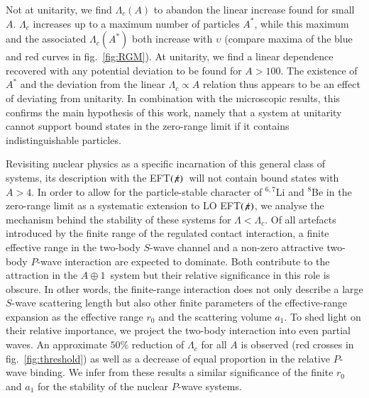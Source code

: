 \documentclass[preprint,12pt]{elsarticle}
\newcommand{\lc}{\ensuremath{\Lambda_c}}
\newcommand{\abb}{\mbox{\ensuremath{A\oplus 1}}}
\newcommand{\eftnopi}{\mbox{EFT$(\not \! \pi)$}}
\newcommand{\figref}[1]{fig.~\ref{#1}}
\begin{document}
Not at unitarity, we find $\lc(A)$ to abandon the linear increase found for small $A$.
$\lc$ increases up to a maximum number of particles $A^*$, while this maximum and the associated $\lc(A^*)$
both increase with $\upsilon$ (compare maxima of the blue and red curves in fig.~\ref{fig:RGM}). At unitarity,
we find a linear dependence recovered with any potential deviation to be found for $A>100$.
The existence of $A^*$ and the deviation from the linear $\Lambda_c\propto A$ relation thus appears to be an effect of deviating from unitarity.
In combination with the microscopic results, this confirms the main hypothesis of this work, namely that a system at unitarity cannot
support bound states in the zero-range limit if it contains indistinguishable particles.

Revisiting nuclear physics as a specific incarnation of this general class of systems,
its description with the \eftnopi~will not contain bound states with $A>4$.
In order to allow for the particle-stable character of $^{6,7}$Li and $^8$Be in the zero-range limit as a systematic
extension to LO \eftnopi, we analyse the mechanism behind the stability of these systems for $\Lambda<\lc$.
Of all artefacts introduced by the finite range of the regulated contact interaction,
a finite effective range in the two-body $S$-wave channel and a non-zero attractive two-body $P$-wave interaction are expected to dominate. 
Both contribute to the attraction in the \abb~system but their relative significance in this role is obscure.
In other words, the finite-range interaction does not only describe a large $S$-wave scattering length but
also other finite parameters of the effective-range expansion as the effective range $r_0$ and the scattering volume $a_1$.
To shed light on their relative importance, we project the two-body interaction into even partial waves.
An approximate $50\%$ reduction of $\lc$ for all $A$ is observed (red crosses in \figref{fig:threshold})
as well as a decrease of equal proportion in the relative $P$-wave binding.
We infer from these results a similar significance of the finite $r_0$ and $a_1$ for the stability of the nuclear $P$-wave systems.
%
\end{document}
